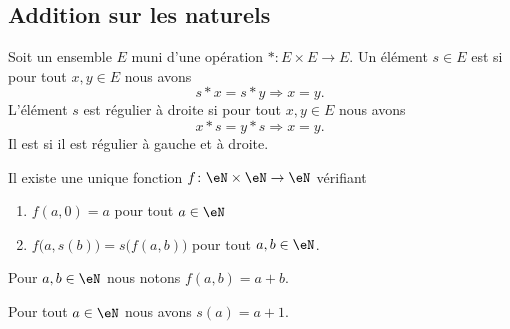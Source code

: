 \subsection{Addition sur les naturels}

\begin{definition}        \label{DEFooIJIEooZaAdSs}
    Soit un ensemble \( E\) muni d'une opération \( *\colon E\times E\to E\). Un élément \( s\in E\) est  si pour tout \( x,y\in E\) nous avons
    \begin{equation}
        s*x=s*y\Rightarrow x=y.
    \end{equation}
    L'élément \( s\) est régulier à droite si pour tout \( x,y\in E\) nous avons
    \begin{equation}
        x*s=y*s\Rightarrow x=y.
    \end{equation}
    Il est  si il est régulier à gauche et à droite.
\end{definition}

\begin{propositionDef}      \label{PROPooVFOXooXmwpFh}
    Il existe une unique fonction \( f\colon \eN\times \eN\to \eN\) vérifiant
    \begin{enumerate}
        \item       \label{ITEMooILZSooNYIkYR}
            \( f(a,0)=a\) pour tout \( a\in \eN\)
        \item       \label{ITEMooZWHQooBAjZyE}
            \( f\big( a,s(b) \big)=s\big( f(a,b) \big)\) pour tout \( a,b\in \eN\).
    \end{enumerate}
    Pour \( a,b\in \eN\) nous notons \( f(a,b)=a+b\).
\end{propositionDef}

\begin{lemma}      \label{LEMooMJMTooOtUuJT}
    Pour tout \( a\in \eN\) nous avons \( s(a)=a+1\).
\end{lemma}

